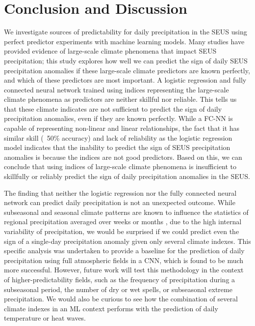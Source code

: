 \documentclass{ametsocV6.1}
\begin{document}
\section{Conclusion and Discussion}
\label{sec:conclusion}

We investigate sources of predictability for daily precipitation in the SEUS using perfect predictor experiments with machine learning models.  Many studies have provided evidence of large-scale climate phenomena that impact SEUS precipitation; this study explores how well we can predict the sign of daily SEUS precipitation anomalies if these large-scale climate predictors are known perfectly, and which of these predictors are most important.  A logistic regression and fully connected neural network trained using indices representing the large-scale climate phenomena as predictors are neither skillful nor reliable.  This tells us that these climate indicates are not sufficient to predict the sign of daily precipitation anomalies, even if they are known perfectly.  While a FC-NN is capable of representing non-linear and linear relationships, the fact that it has similar skill (~50\% accuracy) and lack of reliability as the logistic regression model indicates that the inability to predict the sign of SEUS precipitation anomalies is because the indices are not good predictors. Based on this, we can conclude that using indices of large-scale climate phenomena is insufficient to skillfully or reliably predict the sign of daily precipitation anomalies in the SEUS.

The finding that neither the logistic regression nor the fully connected neural network can predict daily precipitation is not an unexpected outcome. While subseasonal and seasonal climate patterns are known to influence the statistics of regional precipitation averaged over weeks or months \citep[e.g.,][]{ropelewski_north_1986,ropelewski_global_1987,higgins_dominant_2000}, due to the high internal variability of precipitation, we would be surprised if we could predict even the sign of a single-day precipitation anomaly given only several climate indexes. This specific analysis was undertaken to provide a baseline for the prediction of daily precipitation using full atmospheric fields in a CNN, which is found to be much more successful. However, future work will test this methodology in the context of higher-predictability fields, such as the frequency of precipitation during a subseasonal period, the number of dry or wet spells, or subseasonal extreme precipitation. We would also be curious to see how the combination of several climate indexes in an ML context performs with the prediction of daily temperature or heat waves.  
\end{document}
